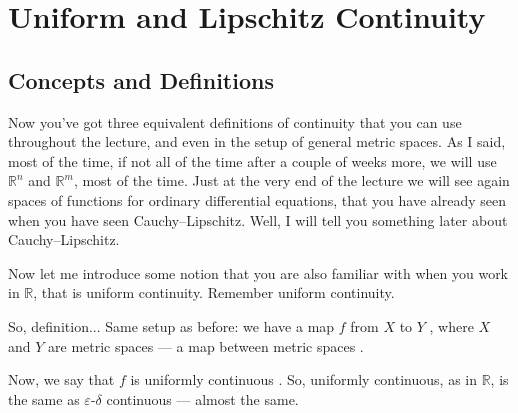 \section{Uniform and Lipschitz Continuity}

\subsection{Concepts and Definitions}

\begin{speech}[00:05:25 - 00:07:38]
Now you've got three equivalent definitions of continuity that you can use throughout the lecture, and even in the setup of general metric spaces. As I said, most of the time, if not all of the time after a couple of weeks more, we will use $\mathbb{R}^n$ and $\mathbb{R}^m$, most of the time. Just at the very end of the lecture we will see again spaces of functions for ordinary differential equations, that you have already seen when you have seen Cauchy--Lipschitz. Well, I will tell you something later about Cauchy--Lipschitz.

Now let me introduce some notion that you are also familiar with when you work in $\mathbb{R}$, that is uniform continuity. Remember uniform continuity.

So, definition...  Same setup as before: we have a map $f$ from $X$ to $Y$ , where $X$ and $Y$ are metric spaces --- a map between metric spaces .

Now, we say that $f$ is uniformly continuous . So, uniformly continuous, as in $\mathbb{R}$, is the same as $\varepsilon$-$\delta$ continuous --- almost the same.
\end{speech}

